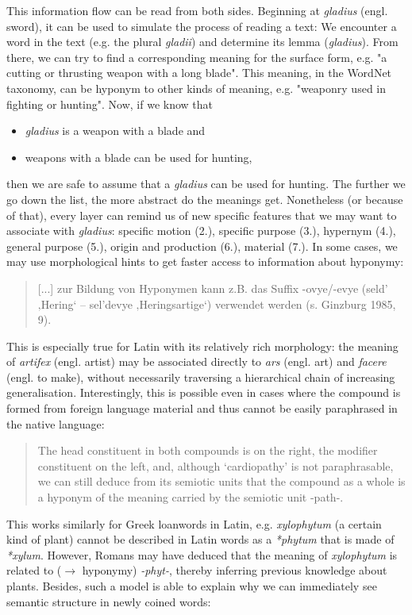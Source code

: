 \documentclass[jou]{apa6} %
\begin{document}
This information flow can be read from both sides. Beginning at \textit{gladius} (engl. sword), it can be used to simulate the process of reading a text: We encounter a word in the text (e.g. the plural \textit{gladii}) and determine its lemma (\textit{gladius}). From there, we can try to find a corresponding meaning for the surface form, e.g. "a cutting or thrusting weapon with a long blade". This meaning, in the WordNet taxonomy, can be hyponym to other kinds of meaning, e.g. "weaponry used in fighting or hunting". Now, if we know that
\begin{itemize}
         \item \textit{gladius} is a weapon with a blade and
         \item weapons with a blade can be used for hunting,
\end{itemize}
then we are safe to assume that a \textit{gladius} can be used for hunting. The further we go down the list, the more abstract do the meanings get. Nonetheless (or because of that), every layer can remind us of new specific features that we may want to associate with \textit{gladius}: specific motion (2.), specific purpose (3.), hypernym (4.), general purpose (5.), origin and production (6.), material (7.). In some cases, we may use morphological hints to get faster access to information about hyponymy:
\blockquote[{\cite[p.~913]{anstattTypenSemantischerRelationen2009a}}]{[...] zur Bildung von Hyponymen kann z.B. das Suffix -ovye/-evye (seld’ ‚Hering‘ – sel’devye ‚Heringsartige‘) verwendet werden (s. Ginzburg 1985, 9).}
This is especially true for Latin with its relatively rich morphology: the meaning of \textit{artifex} (engl. artist) may be associated directly to \textit{ars} (engl. art) and \textit{facere} (engl. to make), without necessarily traversing a hierarchical chain of increasing generalisation. Interestingly, this is possible even in cases where the compound is formed from foreign language material and thus cannot be easily paraphrased in the native language:
\blockquote[{\cite[p.~33]{souille-rigautSemanticAccountQuasiLexemes2010}}]{The head constituent in both compounds is on the right, the modifier constituent on the left, and, although ‘cardiopathy’ is not paraphrasable, we can still deduce from its semiotic units that the compound as a whole is a hyponym of the meaning carried by the semiotic unit -path-.}
This works similarly for Greek loanwords in Latin, e.g. \textit{xylophytum} (a certain kind of plant) cannot be described in Latin words as a \textit{*phytum} that is made of \textit{*xylum}. However, Romans may have deduced that the meaning of \textit{xylophytum} is related to ($\rightarrow$ hyponymy) \textit{-phyt-}, thereby inferring previous knowledge about plants. Besides, such a model is able to explain why we can immediately see semantic structure in newly coined words:
\end{document}
